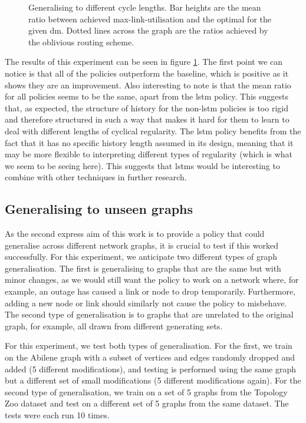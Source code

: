 \begin{figure}
    \centering
    \resizebox{\textwidth}{!}{}
    \caption{Generalising to different cycle lengths. Bar heights are the mean ratio between achieved max-link-utilisation and the optimal for the given \ac{dm}. Dotted lines across the graph are the ratios achieved by the oblivious routing scheme.}
    \label{fig:exp_vary}
\end{figure}

The results of this experiment can be seen in figure \ref{fig:exp_vary}. The first point we can notice is that all of the policies outperform the baseline, which is positive as it shows they are an improvement. Also interesting to note is that the mean ratio for all policies seems to be the same, apart from the \ac{lstm} policy. This suggests that, as expected, the structure of history for the non-\ac{lstm} policies is too rigid and therefore structured in such a way that makes it hard for them to learn to deal with different lengths of cyclical regularity. The \ac{lstm} policy benefits from the fact that it has no specific history length assumed in its design, meaning that it may be more flexible to interpreting different types of regularity (which is what we seem to be seeing here). This suggests that \acp{lstm} would be interesting to combine with other techniques in further research.

\subsection{Generalising to unseen graphs}
As the second express aim of this work is to provide a policy that could generalise across different network graphs, it is crucial to test if this worked successfully. For this experiment, we anticipate two different types of graph generalisation. The first is generalising to graphs that are the same but with minor changes, as we would still want the policy to work on a network where, for example, an outage has caused a link or node to drop temporarily. Furthermore, adding a new node or link should similarly not cause the policy to misbehave. The second type of generalisation is to graphs that are unrelated to the original graph, for example, all drawn from different generating sets.

For this experiment, we test both types of generalisation. For the first, we train on the Abilene graph with a subset of vertices and edges randomly dropped and added (5 different modifications), and testing is performed using the same graph but a different set of small modifications (5 different modifications again). For the second type of generalisation, we train on a set of 5 graphs from the Topology Zoo dataset and test on a different set of 5 graphs from the same dataset. The tests were each run 10 times.

